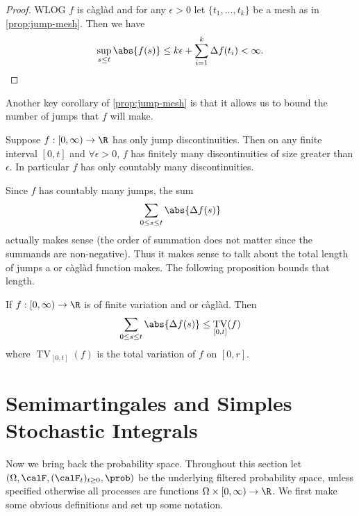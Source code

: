 \documentclass{scrreprt}
\theoremstyle{remark}
\newcommand{\caglad}{c\`agl\`ad}
\newcommand{\filtspace}{(\Omega, \calF, (\calF_t)_{t \geq 0}, \prob)}
\DeclareMathOperator{\TV}{TV}
\begin{document}
\begin{proof}
	WLOG $f$ is \caglad{} and for any $\epsilon > 0$ let $\{t_1, \ldots, t_k\}$ be a mesh as in \vref{prop:jump-mesh}. Then we have
	\begin{equation}
		\sup_{s \leq t} \abs{f(s)} \leq k \epsilon + \sum_{i=1}^k \Delta f(t_i) < \infty.
	\end{equation}
\end{proof}

Another key corollary of \vref{prop:jump-mesh} is that it allows us to bound the number of jumps that $f$ will make.

\begin{corollary}
	\label{cor:countable-jumps}
	Suppose $f:[0, \infty) \to \R$ has only jump discontinuities. Then on any finite interval $[0, t]$ and $\forall \epsilon > 0$, $f$ has finitely many discontinuities of size greater than $\epsilon$. In particular $f$ has only countably many discontinuities.
\end{corollary}

Since $f$ has countably many jumps, the sum
\begin{equation}
	\sum_{0 \leq s \leq t} \abs{\Delta f(s)}
\end{equation}
actually makes sense (the order of summation does not matter since the summands are non-negative). Thus it makes sense to talk about the total length of jumps a \cadlag{} or \caglad{} function makes. The following proposition bounds that length.

\begin{prop}
	If $f: [0, \infty) \to \R$ is of finite variation and \cadlag{} or c\`agl\`ad. Then 
	\begin{equation}
		\sum_{0 \leq s \leq t} \abs{\Delta f(s)} \leq \TV_{[0, t]}(f)
	\end{equation}
	where $\TV_{[0, t]}(f)$ is the total variation of $f$ on $[0, r]$.
\end{prop}

\section{Semimartingales and Simples Stochastic Integrals}

Now we bring back the probability space. Throughout this section let $\filtspace$ be the underlying filtered probability space, unless specified otherwise all processes are functions $\Omega \times [0, \infty) \to \R$. We first make some obvious definitions and set up some notation.
\end{document}
